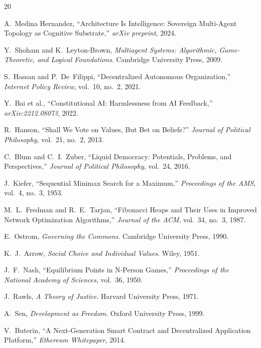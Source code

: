 \documentclass[11pt,twocolumn]{article}
\begin{document}

\begin{thebibliography}{20}

A.~Medina Hernandez, ``Architecture Is Intelligence: Sovereign Multi-Agent
Topology as Cognitive Substrate,'' \textit{arXiv preprint}, 2024.

Y.~Shoham and K.~Leyton-Brown, \textit{Multiagent Systems: Algorithmic,
Game-Theoretic, and Logical Foundations}. Cambridge University Press, 2009.

S.~Hassan and P.~De~Filippi, ``Decentralized Autonomous Organization,''
\textit{Internet Policy Review}, vol.~10, no.~2, 2021.

Y.~Bai et al., ``Constitutional AI: Harmlessness from AI Feedback,''
\textit{arXiv:2212.08073}, 2022.

R.~Hanson, ``Shall We Vote on Values, But Bet on Beliefs?''
\textit{Journal of Political Philosophy}, vol.~21, no.~2, 2013.

C.~Blum and C.~I.~Zuber, ``Liquid Democracy: Potentials, Problems, and
Perspectives,'' \textit{Journal of Political Philosophy}, vol.~24, 2016.

J.~Kiefer, ``Sequential Minimax Search for a Maximum,''
\textit{Proceedings of the AMS}, vol.~4, no.~3, 1953.

M.~L.~Fredman and R.~E.~Tarjan, ``Fibonacci Heaps and Their Uses in
Improved Network Optimization Algorithms,''
\textit{Journal of the ACM}, vol.~34, no.~3, 1987.

E.~Ostrom, \textit{Governing the Commons}. Cambridge University Press, 1990.

K.~J.~Arrow, \textit{Social Choice and Individual Values}. Wiley, 1951.

J.~F.~Nash, ``Equilibrium Points in N-Person Games,''
\textit{Proceedings of the National Academy of Sciences}, vol.~36, 1950.

J.~Rawls, \textit{A Theory of Justice}. Harvard University Press, 1971.

A.~Sen, \textit{Development as Freedom}. Oxford University Press, 1999.

V.~Buterin, ``A Next-Generation Smart Contract and Decentralized Application
Platform,'' \textit{Ethereum Whitepaper}, 2014.


\end{thebibliography}
\end{document}
